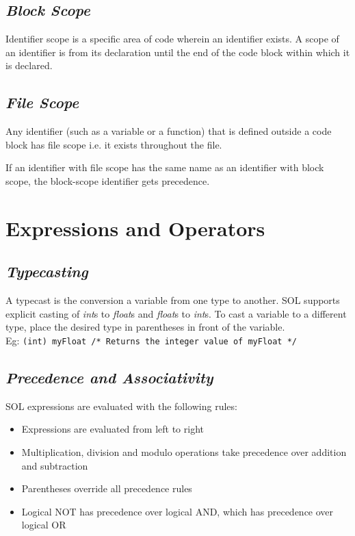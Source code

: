 \documentclass[letterpaper,12pt]{article}
\begin{document}
	\subsection{\textit{Block Scope}}
	Identifier scope is a specific area of code wherein an identifier exists. A scope of an identifier is from its declaration until the end of the code block within which it is declared.
	
	\subsection{\textit{File Scope}}
	Any identifier (such as a variable or a function) that is defined outside a code block has file scope i.e. it exists throughout the file.
	
	If an identifier with file scope has the same name as an identifier with block scope, the block-scope identifier gets precedence.

\section{Expressions and Operators}
	\subsection{\textit{Typecasting}}
	A typecast is the conversion a variable from one type to another. SOL supports explicit casting of \textit{int}s to \textit{float}s and \textit{float}s to \textit{int}s. To cast a variable to a different type, place the desired type in parentheses in front of the variable. \\
	Eg: \texttt{(int) myFloat /* Returns the integer value of myFloat */}
	
	\subsection{\textit{Precedence and Associativity}}
	SOL expressions are evaluated with the following rules:
	\begin{itemize}
		\itemsep0em
		\item Expressions are evaluated from left to right
		\item Multiplication, division and modulo operations take precedence over addition and subtraction
		\item Parentheses override all precedence rules
		\item Logical NOT has precedence over logical AND, which has precedence over logical OR
	\end{itemize}
	
\end{document}
